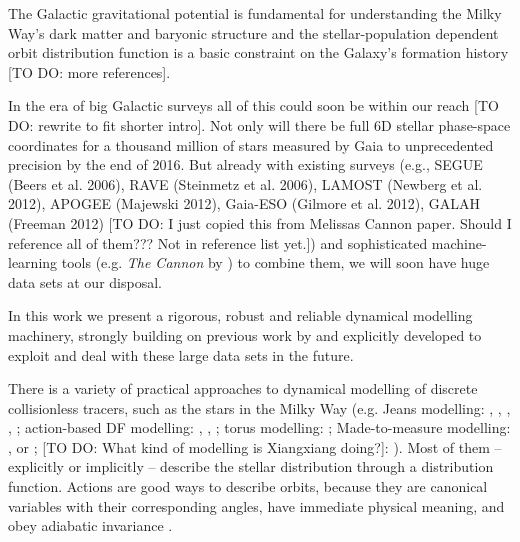 The Galactic gravitational potential is fundamental for understanding the Milky Way's dark matter and baryonic structure \citep{rix13,2012EPJWC..1910002M,2013PhR...531....1S,2014JPhG...41f3101R} and the stellar-population dependent orbit distribution function is a basic constraint on the Galaxy's formation history \citep{rix13} [TO DO: more references].

In the era of big Galactic surveys all of this could soon be within our reach [TO DO: rewrite to fit shorter intro]. Not only will there be full 6D stellar phase-space coordinates for a thousand million of stars measured by Gaia \citep{2001A&A...369..339P} to unprecedented precision by the end of 2016. But already with existing surveys (e.g., SEGUE (Beers et al. 2006), RAVE (Steinmetz et al. 2006), LAMOST (Newberg et al. 2012), APOGEE (Majewski 2012), Gaia-ESO (Gilmore et al. 2012), GALAH (Freeman 2012) [TO DO: I just copied this from Melissas Cannon paper. Should I reference all of them??? Not in reference list yet.]) and sophisticated machine-learning tools (e.g. \emph{The Cannon} by \citet{nes15}) to combine them, we will soon have huge data sets at our disposal.

In this work we present a rigorous, robust and reliable dynamical modelling machinery, strongly building on previous work by \citet{bin11,bin12,bov13,bov15} and explicitly developed to exploit and deal with these large data sets in the future.

There is a variety of practical approaches to dynamical modelling of discrete collisionless tracers, such as the stars in the Milky Way (e.g. Jeans modelling: \citet{1989MNRAS.239..605K}, \citet{2012ApJ...756...89B}, \citet{2012MNRAS.425.1445G}, \citet{2013ApJ...772..108Z}, \citet{bue15}; action-based DF modelling: \citet{bov13}, \citet{pif14}, \citet{san15}; torus modelling:  \citet{2012MNRAS.419.2251M,2013MNRAS.433.1411M}; Made-to-measure modelling: \citet{sye96}, \citet{lor07} or \citet{hun14}; [TO DO: What kind of modelling is Xiangxiang doing?]: \citet{2015arXiv150606144X}). Most of them -- explicitly or implicitly -- describe the stellar distribution through a distribution function.  Actions are good ways to describe orbits, because they are canonical variables with their corresponding angles, have immediate physical meaning, and obey adiabatic invariance \citep{bin08,2008MNRAS.390..429M,bin10,bin11,bin11b}.\\

